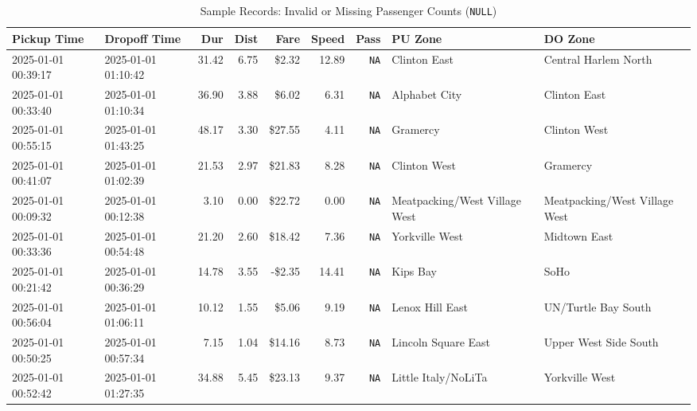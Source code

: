 \documentclass[11pt,a4paper]{article}
\begin{document}
\begin{table}[htbp]
\centering
\caption{Sample Records: Invalid or Missing Passenger Counts (\texttt{NULL})}
\label{tab:sample_passengers}
\tiny
\begin{tabularx}{\textwidth}{l l r r r r r X X}
\toprule
\textbf{Pickup Time} & \textbf{Dropoff Time} & \textbf{Dur} & \textbf{Dist} & \textbf{Fare} & \textbf{Speed} & \textbf{Pass} & \textbf{PU Zone} & \textbf{DO Zone} \\
\midrule
2025-01-01 00:39:17 & 2025-01-01 01:10:42 & 31.42 & 6.75 & \$2.32 & 12.89 & \texttt{NA} & Clinton East & Central Harlem North \\
2025-01-01 00:33:40 & 2025-01-01 01:10:34 & 36.90 & 3.88 & \$6.02 & 6.31 & \texttt{NA} & Alphabet City & Clinton East \\
2025-01-01 00:55:15 & 2025-01-01 01:43:25 & 48.17 & 3.30 & \$27.55 & 4.11 & \texttt{NA} & Gramercy & Clinton West \\
2025-01-01 00:41:07 & 2025-01-01 01:02:39 & 21.53 & 2.97 & \$21.83 & 8.28 & \texttt{NA} & Clinton West & Gramercy \\
2025-01-01 00:09:32 & 2025-01-01 00:12:38 & 3.10 & 0.00 & \$22.72 & 0.00 & \texttt{NA} & Meatpacking/West Village West & Meatpacking/West Village West \\
2025-01-01 00:33:36 & 2025-01-01 00:54:48 & 21.20 & 2.60 & \$18.42 & 7.36 & \texttt{NA} & Yorkville West & Midtown East \\
2025-01-01 00:21:42 & 2025-01-01 00:36:29 & 14.78 & 3.55 & -\$2.35 & 14.41 & \texttt{NA} & Kips Bay & SoHo \\
2025-01-01 00:56:04 & 2025-01-01 01:06:11 & 10.12 & 1.55 & \$5.06 & 9.19 & \texttt{NA} & Lenox Hill East & UN/Turtle Bay South \\
2025-01-01 00:50:25 & 2025-01-01 00:57:34 & 7.15 & 1.04 & \$14.16 & 8.73 & \texttt{NA} & Lincoln Square East & Upper West Side South \\
2025-01-01 00:52:42 & 2025-01-01 01:27:35 & 34.88 & 5.45 & \$23.13 & 9.37 & \texttt{NA} & Little Italy/NoLiTa & Yorkville West \\
\bottomrule
\end{tabularx}
\end{table}
\end{document}
